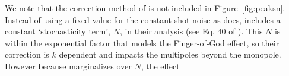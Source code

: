                                                                                                                                                                                                                                                                          We note that the correction method of \cite{Beutler:2014aa} 
                                                                                                                                                                                                                                                                         is not included in Figure~\ref{fig:peaksn}. Instead of using 
                                                                                                                                                                                                                                                                         a fixed value for the constant shot noise as \cite{Gil-Marin:2014aa} does, 
                                                                                                                                                                                                                                                                         \cite{Beutler:2014aa} includes a constant `stochasticity term', $N$, 
                                                                                                                                                                                                                                                                         in their analysis (see Eq. 40 of \citealt{Beutler:2014aa}). This $N$ is 
                                                                                                                                                                                                                                                                         within the exponential factor that models the Finger-of-God effect, so their 
                                                                                                                                                                                                                                                                         correction is $k$ dependent and impacts the multipoles beyond the monopole.
                                                                                                                                                                                                                                                                         However because \cite{Beutler:2014aa} marginalizes over $N$, the effect 
